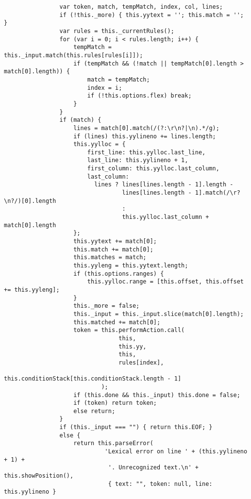\begin{verbatim}
                var token, match, tempMatch, index, col, lines;
                if (!this._more) { this.yytext = ''; this.match = ''; }
                var rules = this._currentRules();
                for (var i = 0; i < rules.length; i++) {
                    tempMatch = this._input.match(this.rules[rules[i]]);
                    if (tempMatch && (!match || tempMatch[0].length > match[0].length)) {
                        match = tempMatch;
                        index = i;
                        if (!this.options.flex) break;
                    }
                }
                if (match) {
                    lines = match[0].match(/(?:\r\n?|\n).*/g);
                    if (lines) this.yylineno += lines.length;
                    this.yylloc = {
                        first_line: this.yylloc.last_line,
                        last_line: this.yylineno + 1,
                        first_column: this.yylloc.last_column,
                        last_column: 
                          lines ? lines[lines.length - 1].length - 
                                  lines[lines.length - 1].match(/\r?\n?/)[0].length 
                                  : 
                                  this.yylloc.last_column + match[0].length
                    };
                    this.yytext += match[0];
                    this.match += match[0];
                    this.matches = match;
                    this.yyleng = this.yytext.length;
                    if (this.options.ranges) {
                        this.yylloc.range = [this.offset, this.offset += this.yyleng];
                    }
                    this._more = false;
                    this._input = this._input.slice(match[0].length);
                    this.matched += match[0];
                    token = this.performAction.call(
                                 this, 
                                 this.yy, 
                                 this, 
                                 rules[index], 
                                 this.conditionStack[this.conditionStack.length - 1]
                            );
                    if (this.done && this._input) this.done = false;
                    if (token) return token;
                    else return;
                }
                if (this._input === "") { return this.EOF; } 
                else {
                    return this.parseError(
                             'Lexical error on line ' + (this.yylineno + 1) + 
                              '. Unrecognized text.\n' + this.showPosition(), 
                              { text: "", token: null, line: this.yylineno }

\end{verbatim}

